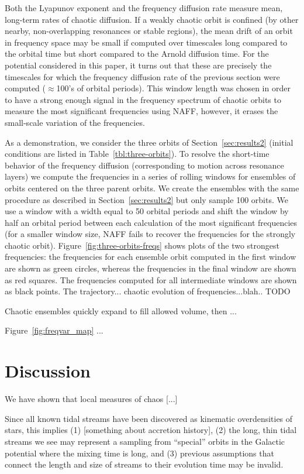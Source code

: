 \documentclass[letterpaper,12pt,preprint]{aastex}
\begin{document}
Both the Lyapunov exponent and the frequency diffusion rate measure mean, long-term rates of chaotic diffusion. If a weakly chaotic orbit is confined (by other nearby, non-overlapping resonances or stable regions), the mean drift of an orbit in frequency space may be small if computed over timescales long compared to the orbital time but short compared to the Arnold diffusion time. For the potential considered in this paper, it turns out that these are precisely the timescales for which the frequency diffusion rate of the previous section were computed ($\approx$100's of orbital periods). This window length was chosen in order to have a strong enough signal in the frequency spectrum of chaotic orbits to measure the most significant frequencies using NAFF, however, it erases the small-scale variation of the frequencies. 

As a demonstration, we consider the three orbits of Section~\ref{sec:results2} (initial conditions are listed in Table~\ref{tbl:three-orbits}). To resolve the short-time behavior of the frequency diffusion (corresponding to motion across resonance layers) we compute the frequencies in a series of rolling windows for ensembles of  orbits centered on the three parent orbits. We create the ensembles with the same procedure as described in Section~\ref{sec:results2} but only sample 100 orbits. We use a window with a width equal to 50 orbital periods and shift the window by half an orbital period between each calculation of the most significant frequencies (for a smaller window size, NAFF fails to recover the frequencies for the strongly chaotic orbit). Figure~\ref{fig:three-orbits-freqs} shows plots of the two strongest frequencies: the frequencies for each ensemble orbit computed in the first window are shown as green circles, whereas the frequencies in the final window are shown as red squares. The frequencies computed for all intermediate windows are shown as black points. The trajectory... chaotic evolution of frequencies...blah.. TODO

Chaotic ensembles quickly expand to fill allowed volume, then ...

Figure~\ref{fig:freqvar_map} ... 

\section{Discussion}\label{sec:discussion}

We have shown that local measures of chaos [...]

Since all known tidal streams have been discovered as kinematic overdensities of stars, this implies (1) [something about accretion history], (2) the long, thin tidal streams we see may represent a sampling from ``special'' orbits in the Galactic potential where the mixing time is long, and (3) previous assumptions that connect the length and size of streams to their evolution time may be invalid.
\end{document}
